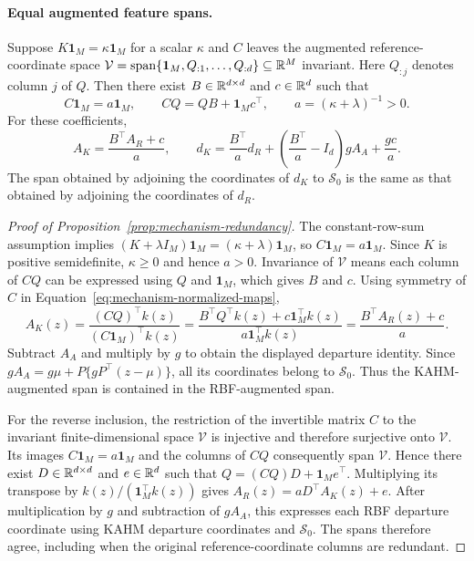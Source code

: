 \paragraph{Equal augmented feature spans.}
Suppose $K\mathbf1_M=\kappa\mathbf1_M$ for a scalar $\kappa$ and
$C$ leaves the augmented reference-coordinate space
$\mathcal V=\operatorname{span}\{\mathbf1_M,Q_{:1},\ldots,Q_{:d}\}
\subseteq\mathbb{R}^M$ invariant. Here $Q_{:j}$ denotes column $j$ of $Q$.
Then there exist $B\in\mathbb{R}^{d\times d}$ and $c\in\mathbb{R}^d$ such that
\[
 C\mathbf1_M=a\mathbf1_M,\qquad
 CQ=QB+\mathbf1_M c^\top,\qquad a=(\kappa+\lambda)^{-1}>0.
\]
For these coefficients,
\[
 A_K=\frac{B^\top A_R+c}{a},\qquad
 d_K=\frac{B^\top}{a}d_R+
 \left(\frac{B^\top}{a}-I_d\right)gA_A+\frac{gc}{a}.
\]
The span obtained by adjoining the coordinates of $d_K$ to
$\mathcal S_0$ is the same as that obtained by adjoining the coordinates
of $d_R$.
\begin{proof}[Proof of Proposition~\ref{prop:mechanism-redundancy}]
The constant-row-sum assumption implies
$(K+\lambda I_M)\mathbf1_M=(\kappa+\lambda)\mathbf1_M$,
so $C\mathbf1_M=a\mathbf1_M$. Since $K$ is positive semidefinite,
$\kappa\geq0$ and hence $a>0$. Invariance of $\mathcal V$ means each
column of $CQ$ can be expressed using $Q$ and $\mathbf1_M$, which gives
$B$ and $c$. Using symmetry of $C$ in
Equation~\eqref{eq:mechanism-normalized-maps},
\[
 A_K(z)=
 \frac{(CQ)^\top k(z)}{(C\mathbf1_M)^\top k(z)}
 =\frac{B^\top Q^\top k(z)+c\mathbf1_M^\top k(z)}
 {a\mathbf1_M^\top k(z)}
 =\frac{B^\top A_R(z)+c}{a}.
\]
Subtract $A_A$ and multiply by $g$ to obtain the displayed departure
identity. Since $gA_A=g\mu+P\{gP^\top(z-\mu)\}$, all its coordinates
belong to $\mathcal S_0$. Thus the KAHM-augmented span is contained in
the RBF-augmented span.

For the reverse inclusion, the restriction of the invertible matrix $C$
to the invariant finite-dimensional space $\mathcal V$ is injective and
therefore surjective onto $\mathcal V$. Its images
$C\mathbf1_M=a\mathbf1_M$ and the columns of $CQ$ consequently span
$\mathcal V$. Hence there exist $D\in\mathbb{R}^{d\times d}$ and $e\in\mathbb{R}^d$ such that
$Q=(CQ)D+\mathbf1_M e^\top$. Multiplying its transpose by
$k(z)/(\mathbf1_M^\top k(z))$ gives
$A_R(z)=aD^\top A_K(z)+e$. After multiplication by $g$ and subtraction
of $gA_A$, this expresses each RBF departure coordinate using KAHM
departure coordinates and $\mathcal S_0$. The spans therefore agree,
including when the original reference-coordinate columns are redundant.
\end{proof}

